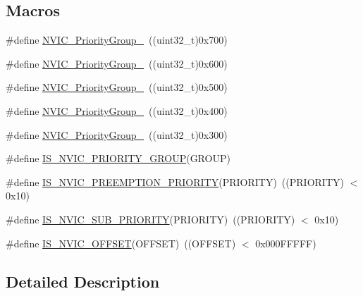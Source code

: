 \subsection*{Macros}
\begin{DoxyCompactItemize}
\item 
\#define \hyperlink{group___preemption___priority___group_gaeac0cf537f65d17bc19aee2410b2b60e}{N\+V\+I\+C\+\_\+\+Priority\+Group\+\_}~((uint32\+\_\+t)0x700)
\item 
\#define \hyperlink{group___preemption___priority___group_ga89bf0bf9e70f1a372a541b1b8d7493aa}{N\+V\+I\+C\+\_\+\+Priority\+Group\+\_}~((uint32\+\_\+t)0x600)
\item 
\#define \hyperlink{group___preemption___priority___group_ga505002e8b76aef65499ca371e40ec8b4}{N\+V\+I\+C\+\_\+\+Priority\+Group\+\_}~((uint32\+\_\+t)0x500)
\item 
\#define \hyperlink{group___preemption___priority___group_ga49bdbee77d4a70339d63c80462d49b4d}{N\+V\+I\+C\+\_\+\+Priority\+Group\+\_}~((uint32\+\_\+t)0x400)
\item 
\#define \hyperlink{group___preemption___priority___group_gaf9020c585da2a299328f0b06dee391a2}{N\+V\+I\+C\+\_\+\+Priority\+Group\+\_}~((uint32\+\_\+t)0x300)
\item 
\#define \hyperlink{group___preemption___priority___group_ga6569304a39fe4f91bd59b6a586c8ede9}{I\+S\+\_\+\+N\+V\+I\+C\+\_\+\+P\+R\+I\+O\+R\+I\+T\+Y\+\_\+\+G\+R\+O\+UP}(G\+R\+O\+UP)
\item 
\#define \hyperlink{group___preemption___priority___group_gaf30fd8f5960c2e28a772d8f16bb156dd}{I\+S\+\_\+\+N\+V\+I\+C\+\_\+\+P\+R\+E\+E\+M\+P\+T\+I\+O\+N\+\_\+\+P\+R\+I\+O\+R\+I\+TY}(P\+R\+I\+O\+R\+I\+TY)~((P\+R\+I\+O\+R\+I\+TY) $<$ 0x10)
\item 
\#define \hyperlink{group___preemption___priority___group_ga010705bc997dcff935b965b372cba61d}{I\+S\+\_\+\+N\+V\+I\+C\+\_\+\+S\+U\+B\+\_\+\+P\+R\+I\+O\+R\+I\+TY}(P\+R\+I\+O\+R\+I\+TY)~((P\+R\+I\+O\+R\+I\+TY) $<$ 0x10)
\item 
\#define \hyperlink{group___preemption___priority___group_ga1184bbb97d758385f98ab40dd5e5af59}{I\+S\+\_\+\+N\+V\+I\+C\+\_\+\+O\+F\+F\+S\+ET}(O\+F\+F\+S\+ET)~((O\+F\+F\+S\+ET) $<$ 0x000\+F\+F\+F\+F\+F)
\end{DoxyCompactItemize}


\subsection{Detailed Description}


